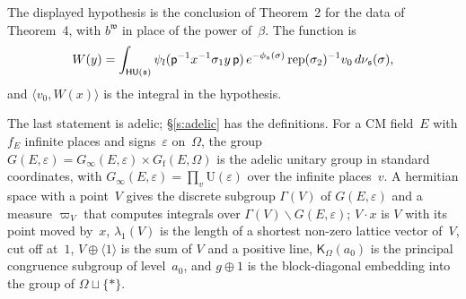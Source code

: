 \documentclass[11pt,a4paper]{article}
\newcommand{\m}[1]{\mbox{$#1$}}        %
\theoremstyle{plainx}
\theoremstyle{uprightx}
\newcommand{\fs}{\mathfrak{s}}
\newcommand{\fp}{\mathsf{p}}
\newcommand{\ip}[2]{\langle #1,#2\rangle}
\newcommand{\Us}[1]{\mathrm{U}(#1)}                      %
\newcommand{\dsc}[2]{\psi_{#1}(#2)}                      %
\begin{document}
The displayed hypothesis is the conclusion of Theorem~2 for the data of Theorem~4, with \m{b^{\mathfrak{w}}} in place of the
power of~$\beta$. The function is
\[W(y)=\int_{\bgr{\fs}}\dsc{l}{\fp^{-1}x^{-1}\sigma_1y\,\fp}\,e^{-\phi_{\fs}(\sigma)}\,\mathrm{rep}(\sigma_2)^{-1}v_0\,d\bms{\fs}(\sigma),\]
and \m{\ip{v_0}{W(x)}} is the integral in the hypothesis.

The last statement is adelic; §\ref{s:adelic} has the definitions. For a CM field~$E$ with $f_E$ infinite places
and signs~$\varepsilon$ on~$\Omega$, the group $G(E,\varepsilon)=G_\infty(E,\varepsilon)\times G_{\mathrm f}(E,\Omega)$ is
the adelic unitary group in standard coordinates, with $G_\infty(E,\varepsilon)=\prod_v\Us{\varepsilon}$ over the
infinite places~$v$. A hermitian space with a point~$V$ gives the discrete subgroup $\Gamma(V)$ of
$G(E,\varepsilon)$ and a measure $\varpi_V$ that computes integrals over \m{\Gamma(V)\backslash G(E,\varepsilon)};
\m{V\cdot x} is $V$ with its point moved by~$x$, $\lambda_1(V)$ is the length of a shortest non-zero lattice vector
of~$V$, cut off at~$1$, \m{V\oplus\langle1\rangle} is the sum of $V$ and a positive line, $\mathsf{K}_\Omega(a_0)$ is the
principal congruence subgroup of level~$a_0$, and \m{g\oplus1} is the block-diagonal embedding into the group of
\m{\Omega\sqcup\{*\}}.
\end{document}
